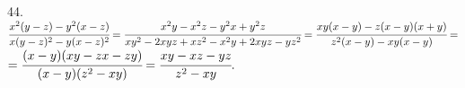 44. $\cfrac{x^2(y-z)-y^2(x-z)}{x(y-z)^2-y(x-z)^2}=\cfrac{x^2y-x^2z-y^2x+y^2z}{xy^2-2xyz+xz^2-x^2y+2xyz-yz^2}=
\cfrac{xy(x-y)-z(x-y)(x+y)}{z^2(x-y)-xy(x-y)}=$\\$=\cfrac{(x-y)(xy-zx-zy)}{(x-y)(z^2-xy)}=\cfrac{xy-xz-yz}{z^2-xy}.$\\
